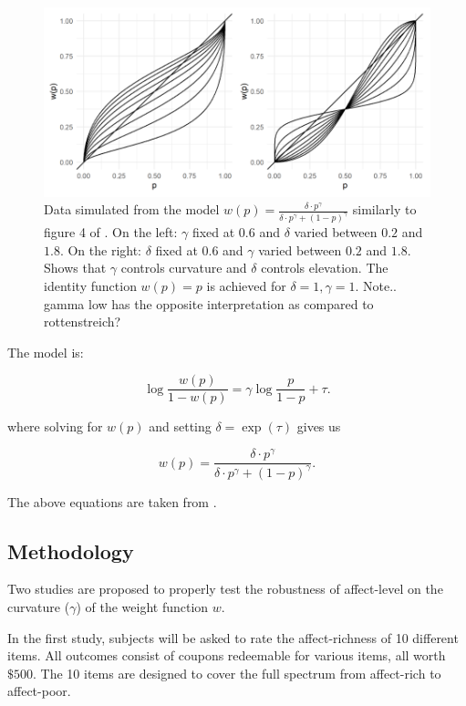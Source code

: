 \documentclass[12pt]{article}
\begin{document}
\begin{figure}[h!]
	\includegraphics[width = \linewidth]{../Figures/Fig2.png}
	\caption{Data simulated from the model
		$w(p) = \frac{\delta \cdot p^{\gamma}}
	{\delta \cdot p^{\gamma} +
	(1-p)^{\gamma}}$ similarly to figure 4
	of \textcite{gonzalez1999shape}.
	On the left: $\gamma$ fixed at $0.6$
	and $\delta$ varied between $0.2$ and $1.8$.
	On the right: $\delta$ fixed at $0.6$
	and $\gamma$ varied between $0.2$ and $1.8$.
	Shows that $\gamma$  controls
	curvature and $\delta$ controls
	elevation. The identity function $w(p) = p$
	is achieved for $\delta = 1, \gamma = 1$.
	Note.. gamma low has the opposite interpretation
	as compared to rottenstreich?}
\end{figure}



\vspace{3mm}

The model is:

\[
	\log\frac{w(p)}{1-w(p)} =
	\gamma \log\frac{p}{1-p} + \tau
.\]

where solving for $w(p)$ and setting $\delta = \exp(\tau)$
gives us

\[
	w(p) = \frac{\delta \cdot p^{\gamma}}
	{\delta \cdot p^{\gamma} +
	(1-p)^{\gamma}}
.\]

The above equations are taken from \textcite{
rottenstreich2001money}.

\subsection{Methodology}

Two studies are proposed to
properly test the robustness
of affect-level on the
curvature ($\gamma$) of the
weight function $w$.

\vspace{3mm}

In the first study, subjects will be asked to
rate the affect-richness of 10 different
items.
All outcomes
consist of coupons redeemable
for various items, all worth $\$500$.
The 10 items are designed to cover the
full spectrum from affect-rich to
affect-poor.
\end{document}

